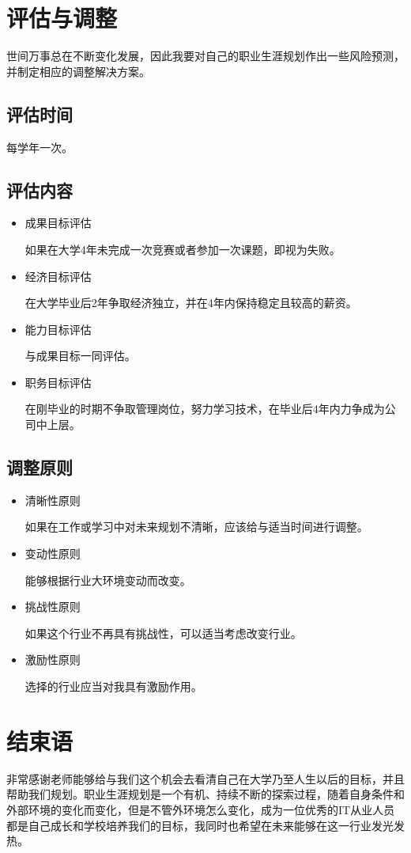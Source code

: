 \documentclass{article}
\begin{document}
\section{评估与调整}
世间万事总在不断变化发展，因此我要对自己的职业生涯规划作出一些风险预测，并制定相应的调整解决方案。
\par 
\subsection{评估时间}
每学年一次。\par
\subsection{评估内容}
\begin{itemize}
    \item 成果目标评估\par
    如果在大学4年未完成一次竞赛或者参加一次课题，即视为失败。
    \item 经济目标评估\par
    在大学毕业后2年争取经济独立，并在4年内保持稳定且较高的薪资。
    \item 能力目标评估\par
    与成果目标一同评估。
     \item 职务目标评估\par
     在刚毕业的时期不争取管理岗位，努力学习技术，在毕业后4年内力争成为公司中上层。
\end{itemize}\par
\subsection{调整原则}
\begin{itemize}
    \item 清晰性原则\par
    如果在工作或学习中对未来规划不清晰，应该给与适当时间进行调整。
    \item  变动性原则\par
    能够根据行业大环境变动而改变。
    \item  挑战性原则\par
    如果这个行业不再具有挑战性，可以适当考虑改变行业。
     \item  激励性原则\par
     选择的行业应当对我具有激励作用。
\end{itemize}
\section{结束语}
非常感谢老师能够给与我们这个机会去看清自己在大学乃至人生以后的目标，并且帮助我们规划。职业生涯规划是一个有机、持续不断的探索过程，随着自身条件和外部环境的变化而变化，但是不管外环境怎么变化，成为一位优秀的IT从业人员都是自己成长和学校培养我们的目标，我同时也希望在未来能够在这一行业发光发热。\par
\end{document}
